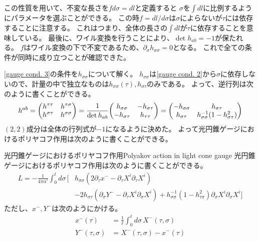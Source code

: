 \documentclass[11pt, dvipdfmx]{article}
\numberwithin{equation}{section}
\newcommand{\blankline}{\par\vspace{\baselineskip}} %
\begin{document}
この性質を用いて、不変な長さを$fd\sigma=dl$と定義すると
$\sigma$を$\int dl$に比例するようにパラメータを選ぶことができる。
この時$f=dl/d\sigma$は$\sigma$によらないが$\tau$には依存することに注意する。
これはつまり、全体の長さの$\int dl$が$\tau$に依存することを意味している。
最後に、ワイル変換を行うことにより、$\det h_{ab}=-1$が保たれる。
$f$はワイル変換の下で不変であるため、$\partial_\sigma h_{\sigma\sigma}=0$となる。
これで全ての条件が同時に成り立つことが確認できた。
\blankline
\eqref{gauge cond. 3}の条件を$h_{\sigma\sigma}$について解く。
$h_{\sigma\sigma}$は\eqref{gauge cond. 2}から$\sigma$に依存しないので、計量の中で独立なものは$h_{\sigma\sigma}(\tau),h_{\sigma\tau}$のみである。
よって、逆行列は次のように書くことができる。
\begin{align}
    h^{ab}=\mqty(h^{\tau\tau}&h^{\tau\sigma}\\h^{\sigma\tau} & h^{\sigma\sigma})=\frac{1}{\det h_{ab}}\mqty(h_{\sigma\sigma} & -h_{\sigma\tau} \\ -h_{\sigma\tau} & h_{\tau\tau})=\mqty(-h_{\sigma\sigma} & h_{\sigma\tau} \\ h_{\sigma\tau} & h_{\sigma\sigma}^{-1}(1-h_{\sigma\tau}^2))
\end{align}
$(2,2)$成分は全体の行列式が$-1$になるように決めた。
よって光円錐ゲージにおけるポリヤコフ作用は次のように書くことができる。
\begin{mythm}{光円錐ゲージにおけるポリヤコフ作用}{Polyakov action in light cone gauge
    }
    光円錐ゲージにおけるポリヤコフ作用は次のように書くことができる。
    \begin{align}
L = -\frac{1}{4\pi\alpha'} \int_0^{\ell} d\sigma \,
\Big[ &h_{\sigma\sigma} \left( 2\partial_\tau x^- - \partial_\tau X^i \partial_\tau X^i \right) \nonumber \\
&- 2h_{\sigma\tau} \left( \partial_\sigma Y^- - \partial_\tau X^i \partial_\sigma X^i \right)
+ h_{\sigma\sigma}^{-1} \left( 1 - h_{\tau\sigma}^2 \right) \partial_\sigma X^i \partial_\sigma X^i \Big] \label{light gauge poly action} 
\end{align}
ただし、$x^-,Y^-$は次のようにかける。
\begin{align}
x^-(\tau) &= \frac{1}{\ell} \int_0^{\ell} d\sigma\, X^-(\tau,\sigma)  \\
Y^-(\tau,\sigma) &= X^-(\tau,\sigma) - x^-(\tau) 
\end{align}
\end{mythm}
\end{document}
